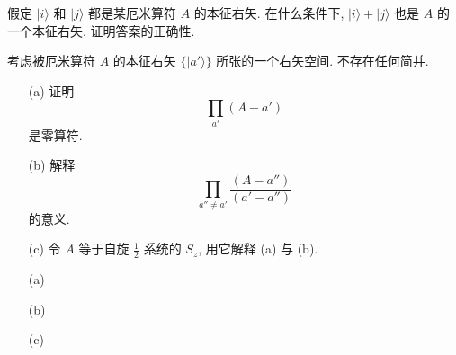 \documentclass{assignment}
\begin{document}
\begin{prob}
    假定 $\lvert i\rangle$ 和 $\lvert j\rangle$ 都是某厄米算符 $A$ 的本征右矢. 在什么条件下, $\lvert i\rangle+\lvert j\rangle$ 也是 $A$ 的一个本征右矢. 证明答案的正确性.
\end{prob}
\begin{sol}
    
\end{sol}

\begin{prob}
    考虑被厄米算符 $A$ 的本征右矢 $\{\lvert a'\rangle\}$ 所张的一个右矢空间. 不存在任何简并.
    \begin{itemize}
        \item[(a)] 证明
        \[
            \prod_{a'}(A-a')
        \]
        是零算符.
        \item[(b)] 解释
        \[
            \prod_{a''\neq a'}\frac{(A-a'')}{(a'-a'')}
        \]
        的意义.
        \item[(c)] 令 $A$ 等于自旋 $\frac{1}{2}$ 系统的 $S_z$, 用它解释 (a) 与 (b).
    \end{itemize}
\end{prob}
\begin{sol}
    \begin{itemize}
        \item[(a)] 
        \item[(b)] 
        \item[(c)] 
    \end{itemize}
\end{sol}
\end{document}
